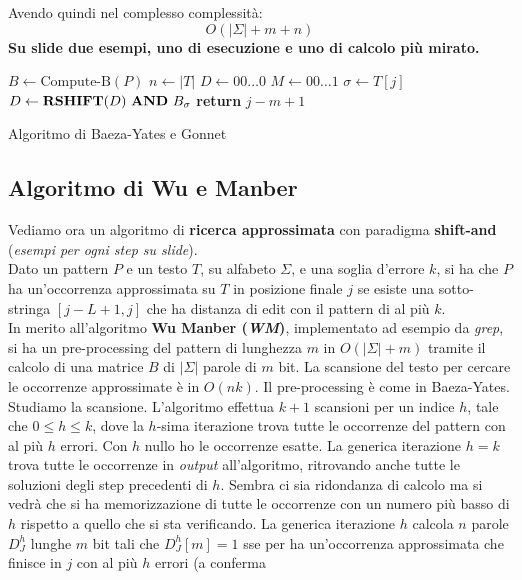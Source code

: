Avendo quindi nel complesso complessità:
\[O(|\Sigma|+m+n)\]
\textbf{Su slide due esempi, uno di esecuzione e uno di calcolo più mirato.}
\begin{algorithm}
  \begin{algorithmic}
    \State $B\gets \mbox{Compute-B}(P)$
    \State $n\gets |T|$
    \State $D\gets 00\ldots 0$
    \State $M\gets 00\ldots 1$
    \State $\sigma\gets T[j]$
    \State $D\gets \mathbf{RSHIFT}(D)\mbox{ \textbf{AND} }B_\sigma$
    \State \textbf{return} $j-m+1$
    \EndIf
    \EndFor
    \EndFunction
  \end{algorithmic}
  \caption{Algoritmo di Baeza-Yates e Gonnet}
\end{algorithm}
\subsection{Algoritmo di Wu e Manber}
Vediamo ora un algoritmo di \textbf{ricerca approssimata} con paradigma
\textbf{shift-and} (\textit{esempi per ogni step su slide}).\\
Dato un pattern $P$ e un testo $T$, su alfabeto $\Sigma$, e una soglia d'errore
$k$, si ha che $P$ ha un'occorrenza approssimata su $T$ in posizione finale $j$
se esiste una sotto-stringa $[j-L+1,j]$ che ha distanza di edit con il pattern di
al più $k$.\\
In merito all'algoritmo \textbf{Wu Manber (\textit{WM})}, implementato ad
esempio da \textit{grep}, si ha un pre-processing del pattern di lunghezza $m$ in
$O(|\Sigma| +m)$ tramite il calcolo di una matrice $B$ di $|\Sigma|$ parole di
$m$ bit. La scansione del testo per cercare le occorrenze approssimate è in
$O(nk)$. Il pre-processing è come in Baeza-Yates.\\
Studiamo la scansione.
L'algoritmo effettua $k+1$ scansioni per un indice $h$, tale che $0\leq h\leq
k$, dove la $h$-sima iterazione trova tutte le occorrenze del pattern con al più
$h$ errori. Con $h$ nullo ho le occorrenze esatte. La generica iterazione $h=k$
trova tutte le occorrenze in \textit{output} all'algoritmo, ritrovando anche tutte le
soluzioni degli step precedenti di $h$. Sembra ci sia ridondanza di calcolo ma
si vedrà che si ha memorizzazione di tutte le occorrenze con un numero più basso
di $h$ rispetto a quello che si sta verificando. La generica iterazione $h$
calcola $n$ parole $D_J^h$ lunghe $m$ bit tali che $D_J^h[m]=1$ sse per ha
un'occorrenza approssimata che finisce in $j$ con al più $h$ errori (a conferma
